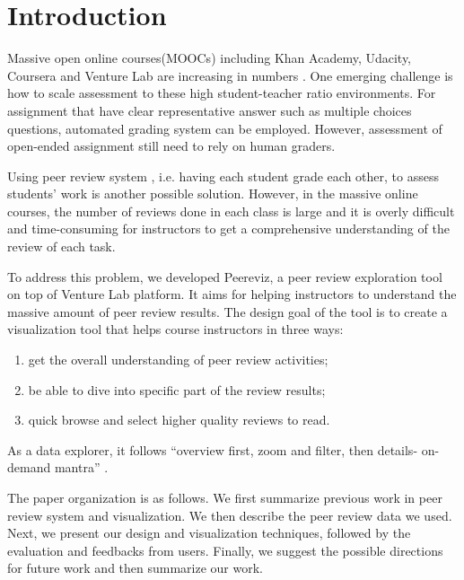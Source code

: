 \documentclass{sigchi}
\begin{document}
\section{Introduction}
Massive open online courses(MOOCs) including Khan Academy, Udacity, Coursera and
Venture Lab are increasing in numbers \cite{nytimes}. One emerging challenge is
how to scale assessment to these high student-teacher ratio environments.
For assignment that have clear representative answer
such as multiple choices questions,
automated grading system can be employed.
However, assessment of open-ended assignment still need to rely on human graders.

Using peer review system \cite{cpr}, i.e. having each student grade each other,
to assess students’ work is another possible solution.
However, in the massive online courses, the number of reviews done in each class
is large and it is overly difficult
and time-consuming for instructors to get a comprehensive understanding
of the review of each task.

To address this problem, we developed Peereviz, a peer review exploration tool
on top of Venture Lab platform. It aims for helping instructors to understand
the massive amount of peer review results. The design goal of the tool is to
create a visualization tool that helps course instructors in three ways:

\begin{enumerate}
\item get the overall understanding of peer review activities;
\item be able to dive into specific part of the review results;
\item quick browse and select higher quality reviews to read.
\end{enumerate}

As a data explorer, it follows ``overview first, zoom and filter, then details-
on-demand mantra'' \cite{card1999readings}.


The paper organization is as follows.
We first summarize previous work in peer review system and visualization.
We then describe the peer review data we used.
Next, we present our design and visualization techniques,
followed by the evaluation and feedbacks from users.
Finally, we suggest the possible directions for future work
and then summarize our work.
\end{document}
